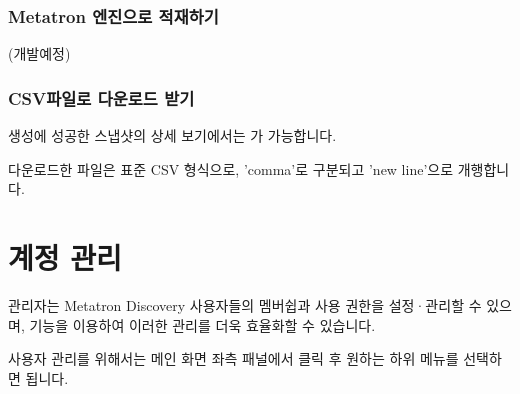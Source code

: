 \documentclass[letterpaper,10pt,english]{sphinxmanual}
\begin{document}
\subsection{Metatron 엔진으로 적재하기}
\label{\detokenize{discovery/part07/data_snapshot:metatron}}\label{\detokenize{discovery/part07/data_snapshot:snapshot-into-druid}}
(개발예정)


\subsection{CSV파일로 다운로드 받기}
\label{\detokenize{discovery/part07/data_snapshot:csv}}\label{\detokenize{discovery/part07/data_snapshot:snapshot-into-csv}}
생성에 성공한 스냅샷의 상세 보기에서는 가 가능합니다.
\begin{quote}

\begin{figure}[H]
\centering

\noindent{}
\end{figure}
\end{quote}

다운로드한 파일은 표준 CSV 형식으로, 'comma'로 구분되고 'new line'으로 개행합니다.
\begin{quote}

\begin{figure}[H]
\centering

\noindent{}
\end{figure}
\end{quote}


\chapter{계정 관리}
\label{\detokenize{discovery/part08/index:id1}}\label{\detokenize{discovery/part08/index::doc}}
관리자는 Metatron Discovery 사용자들의 멤버쉽과 사용 권한을 설정·관리할 수 있으며,  기능을 이용하여 이러한 관리를 더욱 효율화할 수 있습니다.

사용자 관리를 위해서는 메인 화면 좌측 패널에서  클릭 후 원하는 하위 메뉴를 선택하면 됩니다.
\begin{quote}

\begin{figure}[H]
\centering

\noindent{}
\end{figure}
\end{quote}
\end{document}
